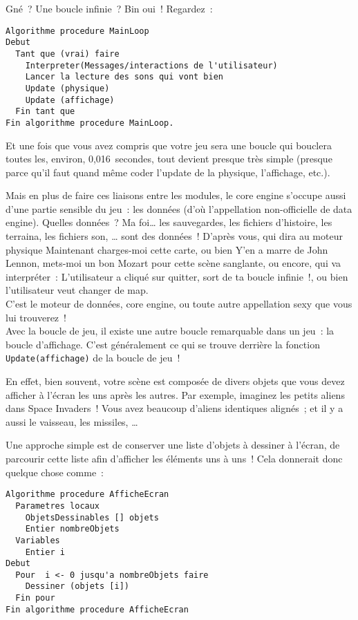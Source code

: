 Gné~? Une boucle infinie~? Bin oui~! Regardez~:

\begin{verbatim}
Algorithme procedure MainLoop
Debut
  Tant que (vrai) faire
    Interpreter(Messages/interactions de l'utilisateur)
    Lancer la lecture des sons qui vont bien
    Update (physique)
    Update (affichage)
  Fin tant que
Fin algorithme procedure MainLoop.
\end{verbatim}

Et une fois que vous avez compris que votre jeu sera une boucle qui \og bouclera\fg{} toutes les, environ, 0,016~secondes, tout devient presque très simple (presque parce qu’il faut quand même coder l'update de la physique, l'affichage, etc.).

Mais en plus de faire ces liaisons entre les modules, le \og core engine\fg{} s’occupe aussi d'une partie sensible du jeu~: les données (d'où l'appellation non-officielle de \og data engine\fg). Quelles données~? Ma foi\ldots{} les sauvegardes, les fichiers d'histoire, les terraina, les fichiers son, \ldots{} sont des données~! D'après vous, qui dira au moteur physique \og Maintenant charges-moi cette carte\fg, ou bien \og Y'en a marre de John Lennon, mets-moi un bon Mozart pour cette scène sanglante\fg, ou encore, qui va interpréter~: \og L'utilisateur a cliqué sur quitter, sort de ta boucle infinie~!\fg, ou bien \og l'utilisateur veut changer de map\fg.\\

C'est le moteur de données, \og core engine\fg, ou toute autre appellation sexy que vous lui trouverez~!\\

Avec la boucle de jeu, il existe une autre boucle remarquable dans un jeu~: la boucle d'affichage. C'est généralement ce qui se trouve derrière la fonction \texttt{Update(affichage)} de la boucle de jeu~!

En effet, bien souvent, votre scène est composée de divers objets que vous devez afficher à l'écran les uns après les autres. Par exemple, imaginez les petits aliens dans Space Invaders~! Vous avez beaucoup d'aliens identiques alignés~; et il y a aussi le vaisseau, les missiles, \ldots

Une approche simple est de conserver une liste d’objets à dessiner à l'écran, de parcourir cette liste afin d'afficher les éléments uns à uns~! Cela donnerait donc quelque chose comme~:

\begin{verbatim}
Algorithme procedure AfficheEcran
  Parametres locaux
    ObjetsDessinables [] objets
    Entier nombreObjets
  Variables
    Entier i
Debut
  Pour  i <- 0 jusqu'a nombreObjets faire
    Dessiner (objets [i])
  Fin pour
Fin algorithme procedure AfficheEcran
\end{verbatim}

